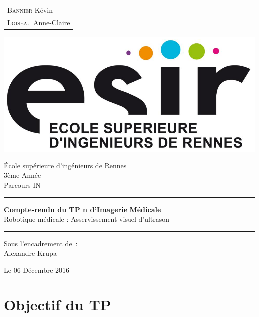 \documentclass[a4paper,11pt]{article}
\begin{document}
\begin{titlepage}
    \vspace{-20px}
    \begin{tabular}{l}
	\textsc{Bannier} K\'evin\\
    \textsc{Loiseau} Anne-Claire
    \end{tabular}
    \hfill \vspace{10px}\includegraphics[scale=0.1]{./images/esir.png}\\
    \vfill
    \begin{center}
        \Huge{\'Ecole sup\'erieure d'ing\'enieurs de Rennes}\\
        \vspace{1cm}
        \LARGE{3\`eme Ann\'ee}\\
        \large{Parcours IN}\\
        \vspace{0.5cm}\hrule\vspace{0.5cm}
        \LARGE{\textbf{Compte-rendu du TP n d'Imagerie M\'edicale}}\\
        \Large{Robotique m\'edicale : Asservissement visuel d'ultrason}
        \vspace{0.5cm}\hrule
        \vfill
        \vfill
    \end{center}
    \begin{flushleft}
        \Large{Sous l'encadrement de~:}\\
        \vspace{0.2cm}
        \large{{Alexandre} Krupa}
    \end{flushleft}
    \hfill \vspace{10px} Le 06 D\'ecembre 2016
    \vfill
\end{titlepage}



\section{Objectif du TP}
\end{document}
